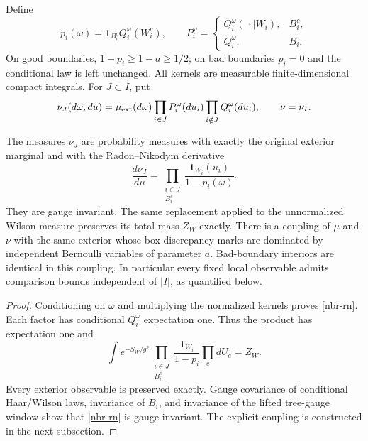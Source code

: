 Define
\begin{equation}
 p_i(\omega)=\mathbf1_{B_i^c}Q_i^\omega(W_i^c),\qquad
 P_i^\omega=
 \begin{cases}
 Q_i^\omega(\,\cdot\mid W_i),&B_i^c,\\
 Q_i^\omega,&B_i.
 \end{cases}
 \label{nbr-kernels}
\end{equation}
On good boundaries, \(1-p_i\ge1-a\ge1/2\); on bad boundaries
\(p_i=0\) and the conditional law is left unchanged. All kernels are
measurable finite-dimensional compact integrals. For \(J\subset I\),
put
\begin{equation}
 \nu_J(d\omega,du)=\mu_{\rm ext}(d\omega)
       \prod_{i\in J}P_i^\omega(du_i)
       \prod_{i\notin J}Q_i^\omega(du_i),\qquad \nu=\nu_I.
 \label{nbr-replacement}
\end{equation}

\begin{theorem}
\label{nbr-main}
The measures \(\nu_J\) are probability measures with exactly the
original exterior marginal and with the Radon--Nikodym derivative
\begin{equation}
 \frac{d\nu_J}{d\mu}
 =\prod_{\substack{i\in J\\B_i^c}}
             \frac{\mathbf1_{W_i}(u_i)}{1-p_i(\omega)}.
 \label{nbr-rn}
\end{equation}
They are gauge invariant. The same replacement applied to the
unnormalized Wilson measure preserves its total mass \(Z_W\) exactly.
There is a coupling of \(\mu\) and \(\nu\) with the same exterior
whose box discrepancy marks are dominated by independent Bernoulli
variables of parameter \(a\). Bad-boundary interiors are identical
in this coupling. In particular every fixed local observable admits
comparison bounds independent of \(|I|\), as quantified below.
\end{theorem}
\begin{proof}
Conditioning on \(\omega\) and multiplying the normalized kernels
proves \eqref{nbr-rn}. Each factor has conditional \(Q_i^\omega\)
expectation one. Thus the product has expectation one and
\begin{equation}
 \int e^{-S_W/g^2}
       \prod_{\substack{i\in J\\B_i^c}}
          \frac{\mathbf1_{W_i}}{1-p_i}\prod_e dU_e=Z_W.
 \label{nbr-raw-mass}
\end{equation}
Every exterior observable is preserved exactly. Gauge covariance of
conditional Haar/Wilson laws, invariance of \(B_i\), and invariance
of the lifted tree-gauge window show that \eqref{nbr-rn} is gauge
invariant. The explicit coupling is constructed in the next subsection.
\end{proof}

